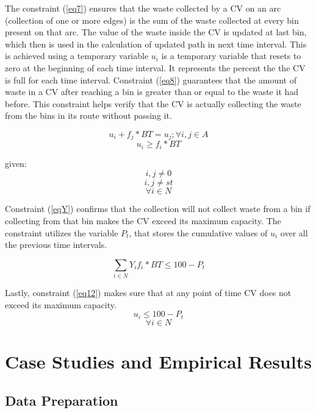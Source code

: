 \documentclass[12pt]{article}
\begin{document}
The constraint (\eqref{eq7}) ensures that the waste collected by a CV on an arc (collection of one or more edges) is the sum of the waste collected at every bin present on that arc. The value of the waste inside the CV is updated at last bin, which then is used in the calculation of updated path in next time interval. This is achieved using a temporary variable $u_i$ is a temporary variable that resets to zero at the beginning of each time interval. It represents the percent the the CV is full for each time interval. Constraint (\eqref{eq8}) guarantees that the amount of waste in a CV after reaching a bin is greater than or equal to the waste it had before. This constraint helps verify that the CV is actually collecting the waste from the bins in its route without passing it. 


\begin{equation}\label{eq7}
    u_i+f_j*BT =u_j ; \forall i,j \in A 
\end{equation}
\begin{equation}\label{eq8}
    u_i\ge f_i*BT
\end{equation}

given: 
$$ i,j\ne 0$$
$$ i,j \ne st $$
$$  \forall i\in N$$

Constraint (\eqref{eqY}) confirms that the collection will not collect waste from a bin if collecting from that bin makes the CV exceed its maximum capacity. The constraint utilizes the variable $P_t$, that stores the cumulative values of $u_i$ over all the previous time intervals.

\begin{equation}\label{eqY}
	\sum_{i\in N}Y_i f_i* BT\le100-P_t
\end{equation}


Lastly, constraint (\eqref{eq12}) makes sure that at any point of time CV does not exceed its maximum capacity. 
\begin{equation}\label{eq12}
    u_i\le 100 - P_t
\end{equation}
$$\forall i \in N $$



\section{Case Studies and Empirical Results}

\subsection{Data Preparation}
\end{document}
